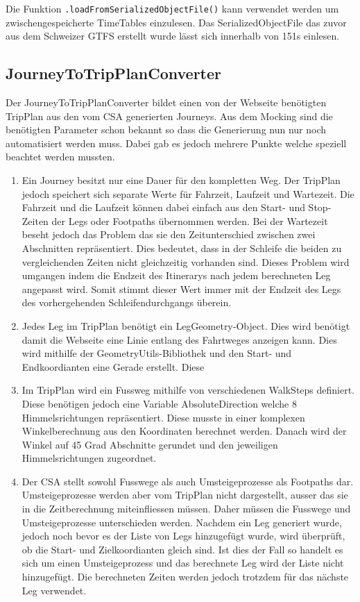Die Funktion \texttt{.loadFromSerializedObjectFile()} kann verwendet werden um zwischengespeicherte TimeTables einzulesen. Das SerializedObjectFile das zuvor aus dem Schweizer GTFS erstellt wurde lässt sich innerhalb von 151s einlesen.


\subsection{JourneyToTripPlanConverter}
Der JourneyToTripPlanConverter bildet einen von der Webseite benötigten TripPlan aus den vom CSA generierten Journeys. Aus dem Mocking sind die benötigten Parameter schon bekannt so dass die Generierung nun nur noch automatisiert werden muss. Dabei gab es jedoch mehrere Punkte welche speziell beachtet werden mussten.
\begin{enumerate}
	\item Ein Journey besitzt nur eine Dauer für den kompletten Weg. Der TripPlan jedoch speichert sich separate Werte für Fahrzeit, Laufzeit und Wartezeit. Die Fahrzeit und die Laufzeit können dabei einfach aus den Start- und Stop-Zeiten der Legs oder Footpaths übernommen werden. Bei der Wartezeit beseht jedoch das Problem das sie den Zeitunterschied zwischen zwei Abschnitten repräsentiert. Dies bedeutet, dass in der Schleife die beiden zu vergleichenden Zeiten nicht gleichzeitig vorhanden sind. Dieses Problem wird umgangen indem die Endzeit des Itinerarys nach jedem berechneten Leg angepasst wird. Somit stimmt dieser Wert immer mit der Endzeit des Legs des vorhergehenden Schleifendurchgangs überein. 
	\item Jedes Leg im TripPlan benötigt ein LegGeometry-Object. Dies wird benötigt damit die Webseite eine Linie entlang des Fahrtweges anzeigen kann. Dies wird mithilfe der GeometryUtils-Bibliothek und den Start- und Endkoordianten eine Gerade erstellt. Diese 
	\item Im TripPlan wird ein Fussweg mithilfe von verschiedenen WalkSteps definiert. Diese benötigen jedoch eine Variable AbsoluteDirection welche 8 Himmelsrichtungen repräsentiert. Diese musste in einer komplexen Winkelberechnung aus den Koordinaten berechnet werden. Danach wird der Winkel auf 45 Grad Abschnitte gerundet und den jeweiligen Himmelsrichtungen zugeordnet.
	\item Der CSA stellt sowohl Fusswege als auch Umsteigeprozesse als Footpaths dar. Umsteigeprozesse werden aber vom TripPlan nicht dargestellt, ausser das sie in die Zeitberechnung miteinfliessen müssen. Daher müssen die Fusswege und Umsteigeprozesse unterschieden werden. Nachdem ein Leg generiert wurde, jedoch noch bevor es der Liste von Legs hinzugefügt wurde, wird überprüft, ob die Start- und Zielkoordianten gleich sind. Ist dies der Fall so handelt es sich um einen Umsteigeprozess und das berechnete Leg wird der Liste nicht hinzugefügt. Die berechneten Zeiten werden jedoch trotzdem für das nächste Leg verwendet.
\end{enumerate}

